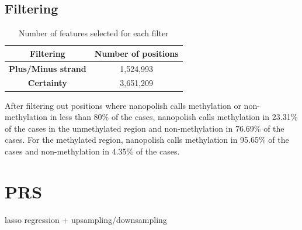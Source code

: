 \subsection{Filtering}

\begin {table}
    \caption{Number of features selected for each filter}
    \begin{center}
        \begin{tabular}{ c c } 
            \hline
            \textbf{Filtering} & \textbf{Number of positions}\\
             \hline
             \hline
             \textbf{Plus/Minus strand} & 1,524,993  \\ 
             \textbf{Certainty} & 3,651,209 \\
             \hline
        \end{tabular}
    \label{table:cont}
    \end{center}
\end{table}



After filtering out positions where nanopolish calls methylation or non-methylation in less than 80\% of the cases, nanopolish calls methylation in 23.31\% of the cases in the unmethylated region and non-methylation in 76.69\% of the cases. For the methylated region, nanopolish calls methylation in 95.65\% of the cases and non-methylation in 4.35\% of the cases.


\section{PRS}
lasso regression + upsampling/downsampling

